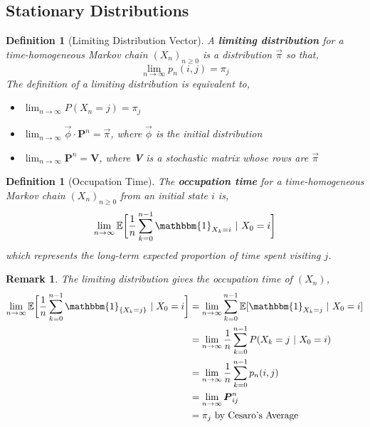 \documentclass{tufte-handout}
\newtheorem{defn}[thm]{Definition}
\newtheorem{rmk}[thm]{Remark}
\begin{document}
  \subsection{Stationary Distributions}
  \begin{defn}[Limiting Distribution Vector]
    A \textbf{limiting distribution} for a time-homogeneous Markov chain $(X_n)_{n \geq 0}$ is a distribution $\Vec{\pi}$ so that,
    \[\lim_{n \rightarrow \infty} p_n(i,j) = \pi_j\]
    \noindent The definition of a limiting distribution is equivalent to,
    \begin{itemize}
      \item $\lim_{n \rightarrow \infty} P(X_n = j) = \pi_j$
      \item $\lim_{n \rightarrow \infty} \Vec{\phi} \cdot \boldsymbol{P}^n = \Vec{\pi}$, where $\Vec{\phi}$ is the initial distribution
      \item $\lim_{n \rightarrow \infty} \boldsymbol{P}^n = \boldsymbol{V}$, where \textbf{V} is a stochastic matrix whose rows are $\Vec{\pi}$
    \end{itemize}
  \end{defn}

  \begin{defn}[Occupation Time]
    The \textbf{occupation time} for a time-homogeneous Markov chain $(X_n)_{n \geq 0}$ from an initial state $i$ is,
    \[
      \lim\limits_{n\rightarrow\infty} \mathbb{E}\bigg[\frac{1}{n} \sum_{k=0}^{n-1} \mathbbm{1}_{X_k = i} \text{ $|$ } X_0 = i\bigg]
    \]
  \noindent which represents the long-term expected proportion of time spent visiting $j$.
  \end{defn}

  \begin{rmk}
    The limiting distribution gives the occupation time of $(X_n)$,
    \begin{align*}
      \lim\limits_{n\rightarrow\infty} \mathbb{E}\bigg[\frac{1}{n} \sum_{k=0}^{n-1} \mathbbm{1}_{\{X_k = j\}} \text{ $|$ } X_0 = i \bigg] &= \lim\limits_{n\rightarrow\infty} \sum_{k=0}^{n-1} \mathbb{E}[\mathbbm{1}_{X_k = j} \text{ $|$ } X_0 = i] \\
      &= \lim\limits_{n\rightarrow\infty} \frac{1}{n} \sum_{k=0}^{n-1} P(X_k = j \text{ $|$ } X_0 = i) \\
      &= \lim\limits_{n\rightarrow\infty} \frac{1}{n} \sum_{k=0}^{n-1} p_n(i,j) \\
      &= \lim\limits_{n\rightarrow\infty} \boldsymbol{P}_{ij}^n \\
      &= \pi_j \text{ by Cesaro's Average}
    \end{align*}
  \end{rmk}
\end{document}
